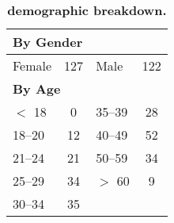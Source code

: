 \begin{table}[t]

\begin{tabularx}{\linewidth}{XcXc}

\multicolumn{4}{l}{\textbf{By Gender}} \\ \midrule
Female & 127 & Male & 122 \\[0.05in]

\multicolumn{2}{l}{\textbf{By Age}} \\ \midrule
$<$ 18 & 0 & 35--39 & 28 \\
18--20 & 12 & 40--49 & 52 \\
21--24 & 21 & 50--59 & 34 \\
25--29 & 34 & $>$ 60 & 9 \\
30--34 & 35 \\

\end{tabularx}

\caption{\textbf{\PhoneLab{} demographic breakdown.}}

\label{table-demographics}

\end{table}
